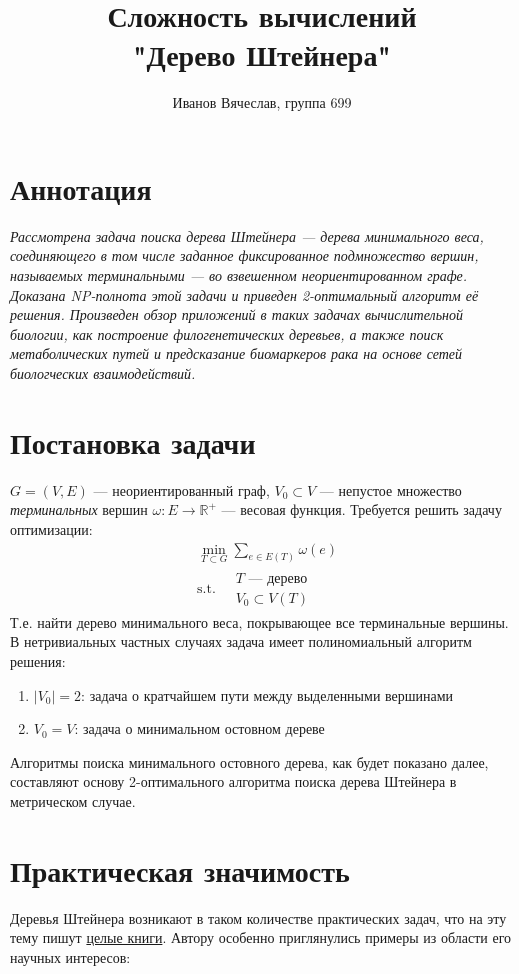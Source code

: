 \documentclass[11pt,a4paper]{report}
\title{Сложность вычислений\\"Дерево Штейнера"}
\author{Иванов Вячеслав, группа 699}
\def\Real{\mathbb{R}}
\theoremstyle{definition}
\theoremstyle{definition}
\theoremstyle{definition}
\begin{document}
	\setlength{\parindent}{1cm}
	{\let\newpage\relax\maketitle}
	\tableofcontents
	\newpage 
	\section{Аннотация}
\textit{	Рассмотрена задача поиска дерева Штейнера — дерева минимального веса, соединяющего в том числе заданное фиксированное подмножество вершин, называемых терминальными — во взвешенном неориентированном графе. Доказана NP-полнота этой задачи и приведен 2-оптимальный алгоритм её решения. Произведен обзор приложений в таких задачах вычислительной биологии, как построение филогенетических деревьев, а также поиск метаболических путей и предсказание биомаркеров рака на основе сетей биологческих взаимодействий. }
	\section{Постановка задачи}
		 $G = (V, E)$ — неориентированный граф, $V_0 \subset V$ — непустое множество \textit{терминальных} вершин $\omega : E \to \Real^{+}$ — весовая функция. Требуется решить задачу оптимизации:
		\begin{align*}
			&\min_{T \subset G} \sum_{e \in E(T)} \omega(e)\\
			&\text{s.t.}\ 
			\begin{aligned}
				&T \text{ — дерево}\\
				&V_0 \subset V(T)			
			\end{aligned}
		\end{align*}
		Т.е. найти дерево минимального веса, покрывающее все терминальные вершины.\\
		В нетривиальных частных случаях задача имеет полиномиальный алгоритм решения:
		\begin{enumerate}
			\item $|V_0| = 2$: задача о кратчайшем пути между выделенными вершинами
			\item $V_0 = V$: задача о минимальном остовном дереве
		\end{enumerate}
		Алгоритмы поиска минимального остовного дерева, как будет показано далее, составляют основу 2-оптимального алгоритма поиска дерева Штейнера в метрическом случае.
	\section{Практическая значимость}
		Деревья Штейнера возникают в таком количестве практических задач, что на эту тему пишут \href{https://www.springer.com/gp/book/9781402000997}{целые книги}. Автору особенно приглянулись примеры из области его научных интересов:
\end{document}

